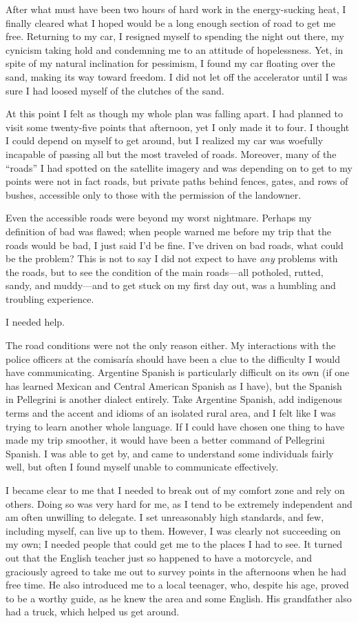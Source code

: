 After what must have been two hours of hard work in the energy-sucking heat, I finally cleared what I hoped would be a long enough section of road to get me free. Returning to my car, I resigned myself to spending the night out there, my cynicism taking hold and condemning me to an attitude of hopelessness. Yet, in spite of my natural inclination for pessimism, I found my car floating over the sand, making its way toward freedom. I did not let off the accelerator until I was sure I had loosed myself of the clutches of the sand.

At this point I felt as though my whole plan was falling apart. I had planned to visit some twenty-five points that afternoon, yet I only made it to four. I thought I could depend on myself to get around, but I realized my car was woefully incapable of passing all but the most traveled of roads. Moreover, many of the ``roads'' I had spotted on the satellite imagery and was depending on to get to my points were not in fact roads, but private paths behind fences, gates, and rows of bushes, accessible only to those with the permission of the landowner.

Even the accessible roads were beyond my worst nightmare. Perhaps my definition of bad was flawed; when people warned me before my trip that the roads would be bad, I just said I’d be fine. I’ve driven on bad roads, what could be the problem? This is not to say I did not expect to have \textit{any} problems with the roads, but to see the condition of the main roads---all potholed, rutted, sandy, and muddy---and to get stuck on my first day out, was a humbling and troubling experience.

I needed help.

The road conditions were not the only reason either. My interactions with the police officers at the comisaría should have been a clue to the difficulty I would have communicating. Argentine Spanish is particularly difficult on its own (if one has learned Mexican and Central American Spanish as I have), but the Spanish in Pellegrini is another dialect entirely. Take Argentine Spanish, add indigenous terms and the accent and idioms of an isolated rural area, and I felt like I was trying to learn another whole language. If I could have chosen one thing to have made my trip smoother, it would have been a better command of Pellegrini Spanish. I was able to get by, and came to understand some individuals fairly well, but often I found myself unable to communicate effectively.

I became clear to me that I needed to break out of my comfort zone and rely on others. Doing so was very hard for me, as I tend to be extremely independent and am often unwilling to delegate. I set unreasonably high standards, and few, including myself, can live up to them. However, I was clearly not succeeding on my own; I needed people that could get me to the places I had to see. It turned out that the English teacher just so happened to have a motorcycle, and graciously agreed to take me out to survey points in the afternoons when he had free time. He also introduced me to a local teenager, who, despite his age, proved to be a worthy guide, as he knew the area and some English. His grandfather also had a truck, which helped us get around.

